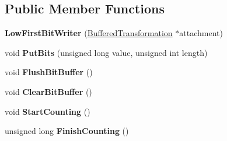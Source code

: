 \subsection*{Public Member Functions}
\begin{DoxyCompactItemize}
\item 
\hypertarget{class_low_first_bit_writer_a8d67445920583ea9223ee504d190a8ec}{
{\bfseries LowFirstBitWriter} (\hyperlink{class_buffered_transformation}{BufferedTransformation} $\ast$attachment)}
\label{class_low_first_bit_writer_a8d67445920583ea9223ee504d190a8ec}

\item 
\hypertarget{class_low_first_bit_writer_a8554aa2126e1236fbcf8956ef98664bc}{
void {\bfseries PutBits} (unsigned long value, unsigned int length)}
\label{class_low_first_bit_writer_a8554aa2126e1236fbcf8956ef98664bc}

\item 
\hypertarget{class_low_first_bit_writer_ae1754cdbee6731279670409c65db0770}{
void {\bfseries FlushBitBuffer} ()}
\label{class_low_first_bit_writer_ae1754cdbee6731279670409c65db0770}

\item 
\hypertarget{class_low_first_bit_writer_accc5bffe4a9459f6ce0b5b678e4a7e04}{
void {\bfseries ClearBitBuffer} ()}
\label{class_low_first_bit_writer_accc5bffe4a9459f6ce0b5b678e4a7e04}

\item 
\hypertarget{class_low_first_bit_writer_ab5e98d9da5beda8cf6b1e33001ce598a}{
void {\bfseries StartCounting} ()}
\label{class_low_first_bit_writer_ab5e98d9da5beda8cf6b1e33001ce598a}

\item 
\hypertarget{class_low_first_bit_writer_ad1f9f0d2d34b06f074ad5de42e59348f}{
unsigned long {\bfseries FinishCounting} ()}
\label{class_low_first_bit_writer_ad1f9f0d2d34b06f074ad5de42e59348f}

\end{DoxyCompactItemize}
